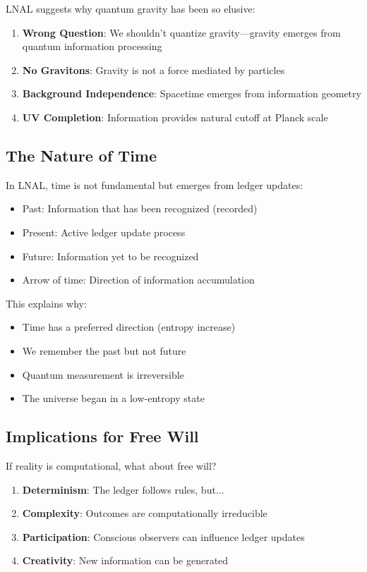 \documentclass[12pt,letterpaper]{article}
\begin{document}
LNAL suggests why quantum gravity has been so elusive:

\begin{enumerate}
    \item \textbf{Wrong Question}: We shouldn't quantize gravity—gravity emerges from quantum information processing
    \item \textbf{No Gravitons}: Gravity is not a force mediated by particles
    \item \textbf{Background Independence}: Spacetime emerges from information geometry
    \item \textbf{UV Completion}: Information provides natural cutoff at Planck scale
\end{enumerate}

\subsection{The Nature of Time}

In LNAL, time is not fundamental but emerges from ledger updates:

\begin{itemize}
    \item Past: Information that has been recognized (recorded)
    \item Present: Active ledger update process
    \item Future: Information yet to be recognized
    \item Arrow of time: Direction of information accumulation
\end{itemize}

This explains why:
\begin{itemize}
    \item Time has a preferred direction (entropy increase)
    \item We remember the past but not future
    \item Quantum measurement is irreversible
    \item The universe began in a low-entropy state
\end{itemize}

\subsection{Implications for Free Will}

If reality is computational, what about free will?

\begin{enumerate}
    \item \textbf{Determinism}: The ledger follows rules, but...
    \item \textbf{Complexity}: Outcomes are computationally irreducible
    \item \textbf{Participation}: Conscious observers can influence ledger updates
    \item \textbf{Creativity}: New information can be generated
\end{enumerate}
\end{document}
